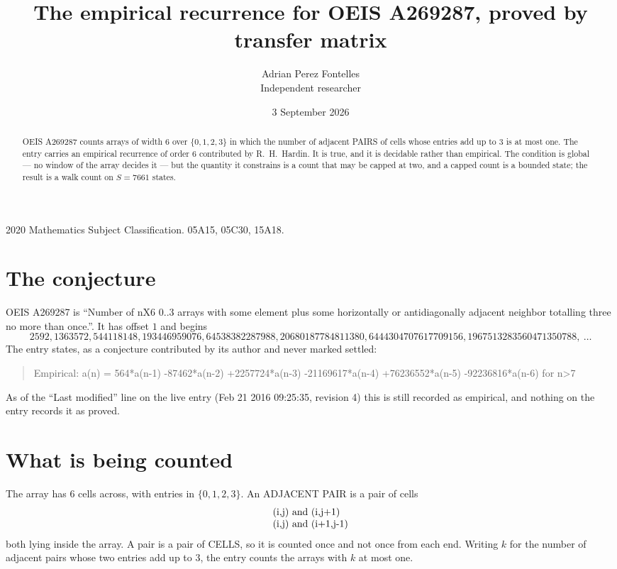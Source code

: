 \documentclass[11pt,a4paper]{article}
\title{The empirical recurrence for OEIS A269287, proved by transfer matrix}
\author{Adrian Perez Fontelles\\ \small Independent researcher}
\date{3 September 2026}
\theoremstyle{plain}
\theoremstyle{definition}
\begin{document}
\maketitle

\begin{abstract}
OEIS A269287 counts arrays of width $6$ over $\{0,1,2,3\}$ in which the number of adjacent PAIRS of
cells whose entries add up to $3$ is at most one. The entry carries an empirical recurrence of
order $6$ contributed by R.~H.~Hardin. It is true, and it is decidable rather than
empirical. The condition is global --- no window of the array decides it --- but the quantity
it constrains is a count that may be capped at two, and a capped count is a bounded state; the
result is a walk count on $S=7661$ states.
\end{abstract}

\noindent\small 2020 Mathematics Subject Classification. 05A15, 05C30, 15A18.\normalsize

\section{The conjecture}

OEIS A269287 is ``Number of nX6 0..3 arrays with some element plus some horizontally or antidiagonally adjacent neighbor totalling three no more than once.''. It has offset $1$ and begins
\[
2592, 1363572, 544118148, 193446959076, 64538382287988, 20680187784811380, 6444304707617709156, 1967513283560471350788,\ \dots
\]
The entry states, as a conjecture contributed by its author and never marked settled:
\begin{quote}
Empirical: a(n) = 564*a(n-1) -87462*a(n-2) +2257724*a(n-3) -21169617*a(n-4) +76236552*a(n-5) -92236816*a(n-6) for n>7
\end{quote}
As of the ``Last modified'' line on the live entry (Feb 21 2016 09:25:35, revision 4) this is still
recorded as empirical, and nothing on the entry records it as proved.

\section{What is being counted}

The array has $6$ cells across, with entries in $\{0,1,2,3\}$. An ADJACENT PAIR is a pair of cells
\[
\begin{array}{l}
$(i,j)\text{ and }(i,j{+}1)$ \\
$(i,j)\text{ and }(i{+}1,j{-}1)$ \\
\end{array}
\]
both lying inside the array. A pair is a pair of CELLS, so it is counted once and not once from
each end. Writing $k$ for the number of adjacent pairs whose two entries add up to $3$, the
entry counts the arrays with $k$ at most one.
\end{document}
